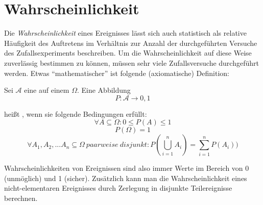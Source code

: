 \section{Wahrscheinlichkeit}

Die \emph{Wahrscheinlichkeit} eines Ereignisses lässt sich auch statistisch als
relative Häufigkeit des Auftretens im Verhältnis zur Anzahl der durchgeführten
Versuche des Zufallsexperiments beschreiben. Um die Wahrscheinlichkeit auf diese
Weise zuverlässig bestimmen zu können, müssen sehr viele Zufallsversuche
durchgeführt werden. Etwas "`mathematischer"' ist folgende (axiomatische)
Definition:

\begin{definition}[Wahrscheinlichkeit]
Sei $\mathcal{A}$ eine  auf einem
 $\Omega$. Eine Abbildung
\[ P: \mathcal{A} \to 0,1 \]

heißt , wenn sie folgende Bedingungen erfüllt:
\[\forall A \subseteq \Omega: 0 \leq P(A) \leq 1\]
\[P(\Omega) = 1\]
\[\forall A_1, A_2, ... A_n \subseteq \Omega\ paarweise\ disjunkt:
P(\bigcup_{i=1}^{n} A_i) = \sum_{i=1}^{n}P(A_i))\]
\end{definition}

Wahrscheinlichkeiten von Ereignissen sind also immer Werte im Bereich von 0
(unmöglich) und 1 (sicher). Zusätzlich kann man die Wahrscheinlichkeit eines
nicht-elementaren Ereignisses durch Zerlegung in disjunkte Teilereignisse
berechnen.
